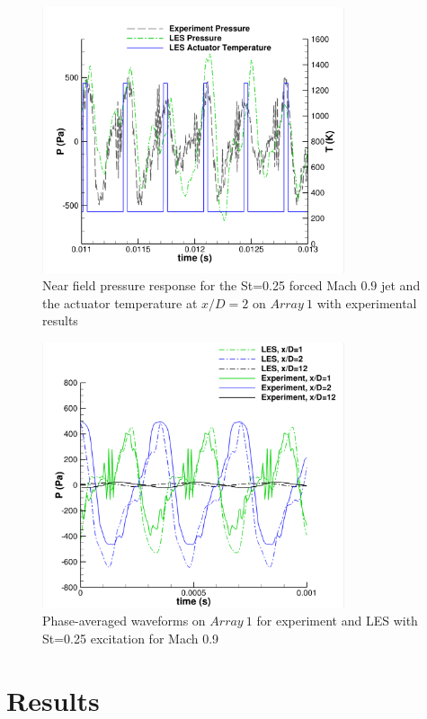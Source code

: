 \documentclass[english]{aiaa-tc}
\begin{document}
\begin{figure}
\begin{center}
	\includegraphics[width=3.5in]{M09pointwithactuatorx2array1ST025}%
	\caption{Near field pressure response for the St=0.25 forced Mach $0.9$ jet and the actuator temperature at $x/D=2$ on $Array~1$ with experimental results \cite{Crawley2014}}
	\label{fig:pointprobeM09}
\end{center}
\end{figure}
\begin{figure}
\begin{center}
	\includegraphics[width=3.5in]{M09LESandExpaxialphase}%
\caption{Phase-averaged waveforms on $Array~1$ for experiment \cite{Crawley2014} and LES with St=0.25 excitation for Mach 0.9}
\label{fig:phasex2all}
\end{center}
 \end{figure}

\section{Results}\label{results}
\end{document}
